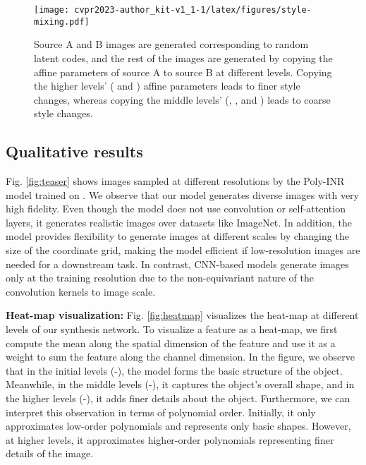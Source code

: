 \begin{figure*}[]
     \centering
\texttt{[image: cvpr2023-author\_kit-v1\_1-1/latex/figures/style-mixing.pdf]}
        \vspace{-0.1in}
        \caption{Source A and B images are generated corresponding to random latent codes, and the rest of the images are generated by copying the affine parameters of source A to source B at different levels. Copying the higher levels' ( and ) affine parameters leads to finer style changes, whereas copying the middle levels' (, , and ) leads to coarse style changes. }
        \label{fig:stylemixing}
\end{figure*}

\subsection{Qualitative results}
Fig. \ref{fig:teaser} shows images sampled at different resolutions by the Poly-INR model trained on . We observe that our model generates diverse images with very high fidelity. Even though the model does not use convolution or self-attention layers, it generates realistic images over datasets like ImageNet. In addition, the model provides flexibility to generate images at different scales by changing the size of the coordinate grid, making the model efficient if low-resolution images are needed for a downstream task. In contrast, CNN-based models generate images only at the training resolution due to the non-equivariant nature of the convolution kernels to image scale. 


\noindent\textbf{Heat-map visualization: }Fig. \ref{fig:heatmap} visualizes the heat-map at different levels of our synthesis network. To visualize a feature as a heat-map, we first compute the mean along the spatial dimension of the feature and use it as a weight to sum the feature along the channel dimension. In the figure, we observe that in the initial levels (-), the model forms the basic structure of the object. Meanwhile, in the middle levels (-), it captures the object's overall shape, and in the higher levels (-), it adds finer details about the object. Furthermore, we can interpret this observation in terms of polynomial order. Initially, it only approximates low-order polynomials and represents only basic shapes. However, at higher levels, it approximates higher-order polynomials representing finer details of the image.




